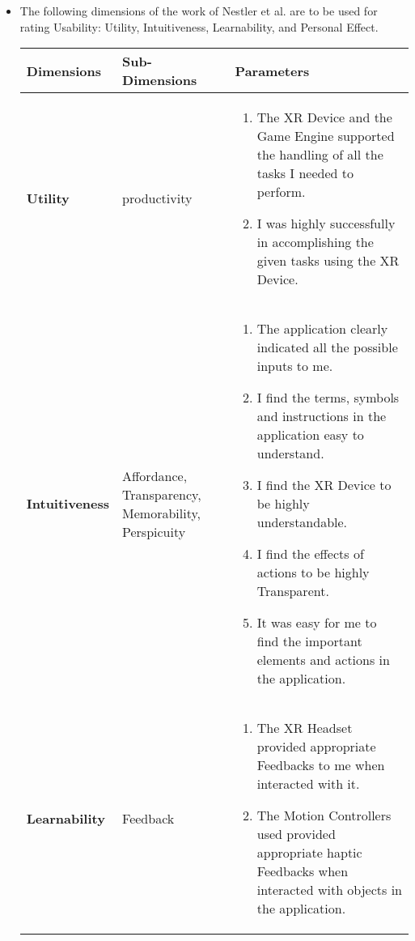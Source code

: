 \documentclass{article}
\begin{document}
\begin{itemize}
	\item The following dimensions of the work of Nestler et al. are to be used for rating Usability: Utility, Intuitiveness, Learnability, and Personal Effect.
	      \begin{table}[htb]
		      \centering
		      \setlength{\leftmargini}{0.4cm}
		      \begin{tabular}{| m{3cm} | m{3cm} | m{8cm} |}
			      \hline
			      \textbf{Dimensions}      & \textbf{Sub-Dimensions}                             & \textbf{Parameters} \\
			      \hline
			      \textbf{Utility}         & productivity                                        &
			      \begin{enumerate}
				      \item The XR Device and the Game Engine supported the handling of all the tasks I needed to perform.
				      \item I was highly successfully in accomplishing the given tasks using the XR Device.
			      \end{enumerate}                                                                               \\
			      \hline
			      \textbf{Intuitiveness}   & Affordance, Transparency, Memorability, Perspicuity &
			      \begin{enumerate}
				      \item The application clearly indicated all the possible inputs to me.
				      \item I find the terms, symbols and instructions in the application easy to understand.
				      \item I find the XR Device to be highly understandable.
				      \item I find the effects of actions to be highly Transparent.
				      \item It was easy for me to find the important elements and actions in the application.
			      \end{enumerate}                                                                               \\
			      \hline
			      \textbf{Learnability}    & Feedback                                            &
			      \begin{enumerate}
				      \item The XR Headset provided appropriate Feedbacks to me when interacted with it.
				      \item The Motion Controllers used provided appropriate haptic Feedbacks when interacted with objects in the application.

\end{enumerate}
\end{tabular}
\end{table}
\end{itemize}
\end{document}
